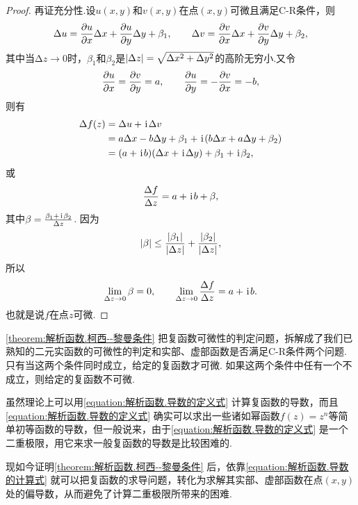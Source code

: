 \begin{theorem}
\begin{proof}
再证充分性.设\(u(x,y)\)和\(v(x,y)\)在点\((x,y)\)可微且满足C-R条件，则\begin{equation*}
\Delta u = \pdv{u}{x} \Delta x + \pdv{u}{y} \Delta y + \beta_1,
\qquad
\Delta v = \pdv{v}{x} \Delta x + \pdv{v}{y} \Delta y + \beta_2,
\end{equation*}其中当\(\increment z\to0\)时，\(\beta_1\)和\(\beta_2\)是\(\abs{\Delta z} = \sqrt{\Delta x^2 + \Delta y^2}\)的高阶无穷小.又令\begin{equation*}
\pdv{u}{x} = \pdv{v}{y} = a,
\qquad
\pdv{u}{y} = -\pdv{v}{x} = -b,
\end{equation*}则有\begin{align*}
\Delta f(z) &= \Delta u + \kern1pt\mathrm{i}\kern1pt \Delta v \\
&= a \Delta x - b \Delta y + \beta_1 + \kern1pt\mathrm{i}\kern1pt (b \Delta x + a \Delta y + \beta_2) \\
&= (a+\kern1pt\mathrm{i}\kern1pt b)(\Delta x + \kern1pt\mathrm{i}\kern1pt \Delta y) + \beta_1 + \kern1pt\mathrm{i}\kern1pt \beta_2,
\end{align*}或\begin{equation*}
\frac{\Delta f}{\Delta z} = a + \kern1pt\mathrm{i}\kern1pt b + \beta,
\end{equation*}其中\(\beta = \frac{\beta_1 + \kern1pt\mathrm{i}\kern1pt \beta_2}{\Delta z}\).
因为\begin{equation*}
\abs{\beta} \leq
\frac{\abs{\beta_1}}{\abs{\Delta z}} + \frac{\abs{\beta_2}}{\abs{\Delta z}},
\end{equation*}所以\begin{equation*}
\lim_{\Delta z\to0} \beta = 0,
\qquad
\lim_{\Delta z\to0} \frac{\Delta f}{\Delta z} = a+\kern1pt\mathrm{i}\kern1pt b.
\end{equation*}
也就是说\(f\)在点\(z\)可微.
\end{proof}
\end{theorem}

\cref{theorem:解析函数.柯西--黎曼条件} 把复函数可微性的判定问题，拆解成了我们已熟知的二元实函数的可微性的判定和实部、虚部函数是否满足C-R条件两个问题.
只有当这两个条件同时成立，给定的复函数才可微.
如果这两个条件中任有一个不成立，则给定的复函数不可微.

虽然理论上可以用\cref{equation:解析函数.导数的定义式} 计算复函数的导数，而且\cref{equation:解析函数.导数的定义式} 确实可以求出一些诸如幂函数\(f(z) = z^n\)等简单初等函数的导数，但一般说来，由于\cref{equation:解析函数.导数的定义式} 是一个二重极限，用它来求一般复函数的导数是比较困难的.

现如今证明\cref{theorem:解析函数.柯西--黎曼条件} 后，依靠\cref{equation:解析函数.导数的计算式} 就可以把复函数的求导问题，转化为求解其实部、虚部函数在点\((x,y)\)处的偏导数，从而避免了计算二重极限所带来的困难.

